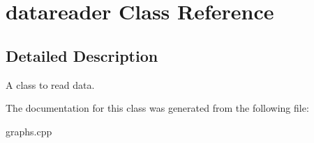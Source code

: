 \hypertarget{classdatareader}{
\section{datareader Class Reference}
\label{classdatareader}
}


\subsection{Detailed Description}
A class to read data. 

The documentation for this class was generated from the following file:\begin{DoxyCompactItemize}
\item 
graphs.cpp\end{DoxyCompactItemize}
